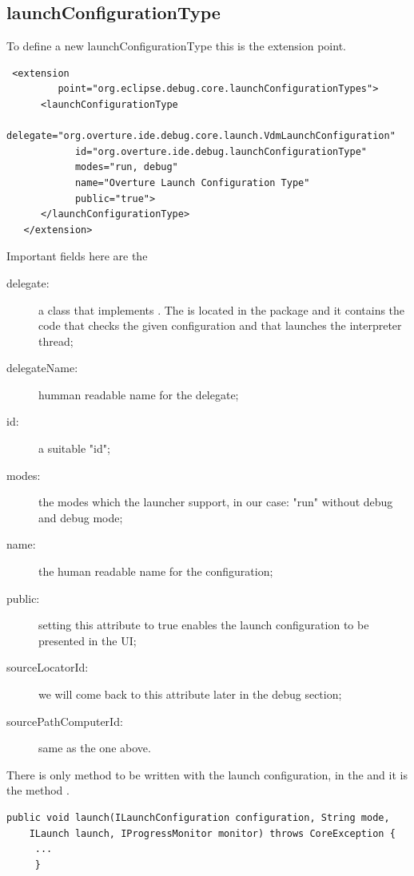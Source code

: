 \subsection{launchConfigurationType}
To define a new launchConfigurationType this is the extension point.

\lstset{language=XML, caption=lauchConfigurationTypes extension point}
\begin{lstlisting}
 <extension
         point="org.eclipse.debug.core.launchConfigurationTypes">
      <launchConfigurationType
            delegate="org.overture.ide.debug.core.launch.VdmLaunchConfiguration"
            id="org.overture.ide.debug.launchConfigurationType"
            modes="run, debug"
            name="Overture Launch Configuration Type"
            public="true">
      </launchConfigurationType>
   </extension>
\end{lstlisting}

Important fields here are the
\begin{description}


\item[delegate:] a class that implements . The  is located in the package  and it contains the code that checks the given configuration and that launches the interpreter thread;

\item[delegateName:] humman readable name for the delegate;

\item[id:] a suitable "id";

\item[modes:] the modes which the launcher support, in our case: "run" without debug and debug mode;

\item[name:] the human readable name for the configuration;

\item[public:] setting this attribute to true enables the launch configuration to be presented in the UI;

\item[sourceLocatorId:] we will come back to this attribute later in the debug section;

\item[sourcePathComputerId:] same as the one above.
\end{description}

There is only method to be written with the launch configuration, in the  and it is the  method .
\begin{lstlisting}
public void launch(ILaunchConfiguration configuration, String mode,
    ILaunch launch, IProgressMonitor monitor) throws CoreException {
	 ...
	 }
\end{lstlisting}


